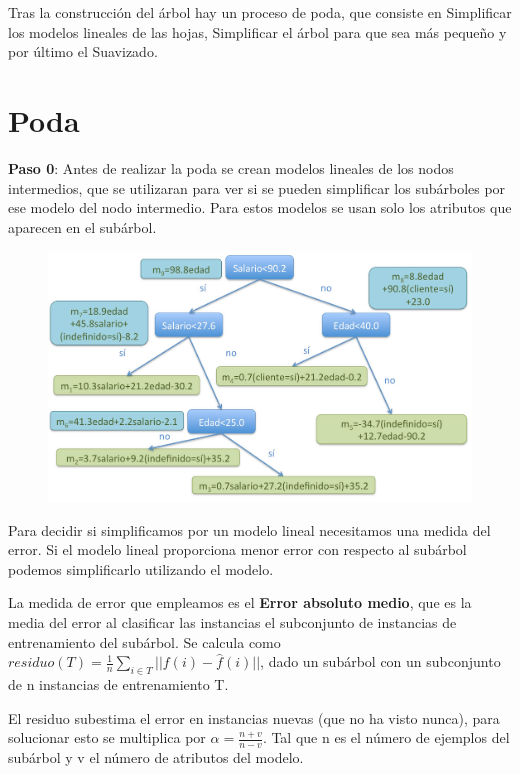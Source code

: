 \documentclass[12pt]{report} %
\begin{document}
Tras la construcción del árbol hay un proceso de poda, que consiste en
Simplificar los modelos lineales de las hojas, Simplificar el árbol para
que sea más pequeño y por último el Suavizado.
\pagebreak
\section{Poda}

\textbf{Paso 0}: Antes de realizar la poda se crean modelos lineales de los nodos
intermedios, que se utilizaran para ver si se pueden simplificar los
subárboles por ese modelo del nodo intermedio. Para estos modelos se
usan solo los atributos que aparecen en el subárbol.

\begin{figure}[H]
	{\includegraphics[scale=.15]{image-20210312090434196.png}}
\end{figure}

Para decidir si simplificamos por un modelo lineal necesitamos una
medida del error. Si el modelo lineal proporciona menor error con
respecto al subárbol podemos simplificarlo utilizando el modelo.

La medida de error que empleamos es el \textbf{Error absoluto medio},
que es la media del error al clasificar las instancias el subconjunto de
instancias de entrenamiento del subárbol. Se calcula como $residuo(T) = \frac 1 n \sum _{i \in T} ||f(i)- \hat{f}(i)||$, dado un
subárbol con un subconjunto de n instancias de entrenamiento T.

El residuo subestima el error en instancias nuevas (que no ha visto
nunca), para solucionar esto se multiplica por
\(\alpha = \frac {n+v}{n-v}\). Tal que n es el número de ejemplos del
subárbol y v el número de atributos del modelo.
\end{document}
